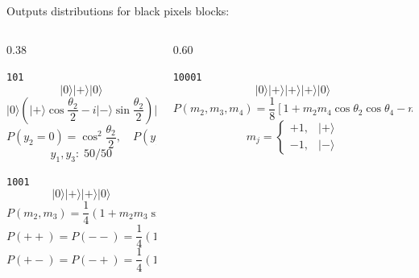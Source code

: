 \documentclass[aspectratio=169]{beamer}
\newcommand{\ket}[1]{\lvert #1\rangle}
\begin{document}
\begin{frame}{Outputs distributions for black pixels blocks:}
  \scriptsize
  \begin{columns}[T,onlytextwidth]
    \begin{column}{0.38\textwidth}
      \begin{minipage}[t][0.23\textheight][t]{\linewidth}
        \begin{block}{\texttt{101}}
          \[
            \ket{0}\ket{+}\ket{0}
          \]
          $$ \ket{0}
          \left(
            \ket{+}\cos\frac{\theta_2}{2}
            -
            i\ket{-}\sin\frac{\theta_2}{2}
          \right)
          \ket{0}.$$
          \[
            P(y_2=0)=\cos^2\frac{\theta_2}{2},
            \quad
            P(y_2=1)=\sin^2\frac{\theta_2}{2}
          \]
          \[
            y_1,y_3:\;50/50
          \]
        \end{block}
      \end{minipage}

      \vspace{0.45em}

      \begin{minipage}[t][0.46\textheight][t]{\linewidth}
        \begin{block}{\texttt{1001}}
          \[
            \ket{0}\ket{+}\ket{+}\ket{0}
          \]
          \[
            P(m_2,m_3)=\frac14\left(1+m_2m_3\sin\theta_2\sin\theta_3\right)
          \]
          \[
            P(++)=P(--)=\frac14\left(1+\sin\theta_2\sin\theta_3\right)
          \]
          \[
            P(+-)=P(-+)=\frac14\left(1-\sin\theta_2\sin\theta_3\right)
          \]
        \end{block}
      \end{minipage}
    \end{column}

    \begin{column}{0.60\textwidth}
      \begin{minipage}[t][0.72\textheight][t]{\linewidth}
        \begin{block}{\texttt{10001}}
          \[
            \ket{0}\ket{+}\ket{+}\ket{+}\ket{0}
          \]
          \[
            P(m_2,m_3,m_4)
            =
            \frac18\left[
              1+m_2m_4\cos\theta_2\cos\theta_4
              -m_2m_3m_4\cos\theta_3\sin\theta_2\sin\theta_4
            \right]
          \]
          \[
            m_j=
            \begin{cases}
              +1,& \ket{+}\\
              -1,& \ket{-}
            \end{cases}
          \]


\end{block}
\end{minipage}
\end{column}
\end{columns}
\end{frame}
\end{document}
